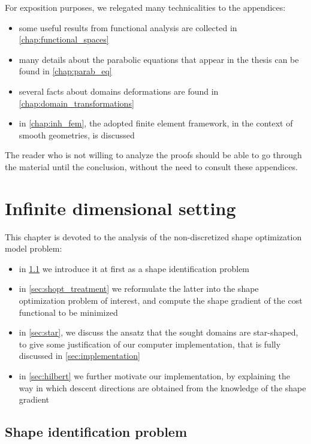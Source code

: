 \documentclass[english,a4paper,10pt,oneside]{scrbook}	%
\theoremstyle{break}
\theoremstyle{remark}
\begin{document}
For exposition purposes, we relegated many technicalities to the appendices:

\begin{itemize}
	\item some useful results from functional analysis are collected in \cref{chap:functional_spaces}
	\item many details about the parabolic equations that appear in the thesis can be found in \cref{chap:parab_eq}
	\item several facts about domains deformations are found in \cref{chap:domain_transformations}
	\item in \cref{chap:inh_fem}, the adopted finite element framework, in the context of smooth geometries, is discussed
\end{itemize}

The reader who is not willing to analyze the proofs should be able to go through the material until the conclusion, without the need to consult these appendices.

\chapter{Infinite dimensional setting}
\label{chap:cts_shape_opt}

This chapter is devoted to the analysis of the non-discretized shape optimization model problem:

\begin{itemize}
	\item in \cref{sec:shid} we introduce it at first as a shape identification problem
	\item in \cref{sec:shopt_treatment} we reformulate the latter into the shape optimization problem of interest, and compute the shape gradient of the cost functional to be minimized
	\item in \cref{sec:star}, we discuss the ansatz that the sought domains are star-shaped, to give some justification of our computer implementation, that is fully discussed in \cref{sec:implementation}
	\item in \cref{sec:hilbert} we further motivate our implementation, by explaining the way in which descent directions are obtained from the knowledge of the shape gradient
\end{itemize}

\section{Shape identification problem}
\label{sec:shid}
\end{document}
